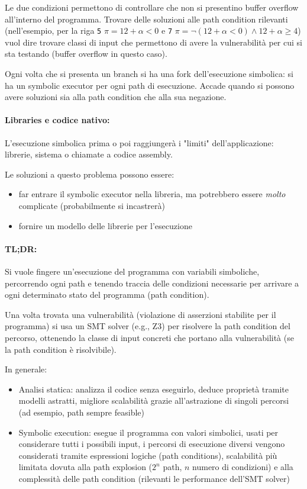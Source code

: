 Le due condizioni permettono di controllare che non si presentino buffer overflow all'interno del programma. Trovare delle soluzioni alle path condition rilevanti (nell'esempio, per la riga \texttt{5} $\pi  =12 + \alpha < 0$ e \texttt{7} $\pi = \neg (12 + \alpha < 0) \wedge 12 + \alpha \geq 4$) vuol dire trovare classi di input che permettono di avere la vulnerabilità per cui si sta testando (buffer overflow in questo caso).

Ogni volta che si presenta un branch si ha una fork dell'esecuzione simbolica: si ha un symbolic executor per ogni path di esecuzione. Accade quando si possono avere soluzioni sia alla path condition che alla sua negazione. 

\paragraph{Libraries e codice nativo:} L'esecuzione simbolica prima o poi raggiungerà i "limiti" dell'applicazione: librerie, sistema o chiamate a codice assembly.

Le soluzioni a questo problema possono essere: 
\begin{itemize}
	\item far entrare il symbolic executor nella libreria, ma potrebbero essere \textit{molto} complicate (probabilmente si incastrerà)

	\item fornire un modello delle librerie per l'esecuzione
\end{itemize}

\paragraph{TL;DR:} Si vuole fingere un'esecuzione del programma con variabili simboliche, percorrendo ogni path e tenendo traccia delle condizioni necessarie per arrivare a ogni determinato stato del programma (path condition). 

Una volta trovata una vulnerabilità (violazione di asserzioni stabilite per il programma) si usa un SMT solver (e.g., Z3) per risolvere la path condition del percorso, ottenendo la classe di input concreti che portano alla vulnerabilità (se la path condition è risolvibile).

In generale:
\begin{itemize}
    \item Analisi statica: analizza il codice senza eseguirlo, deduce proprietà tramite modelli astratti, migliore scalabilità grazie all'astrazione di singoli percorsi (ad esempio, path sempre feasible)
    
    \item Symbolic execution: esegue il programma con valori simbolici, usati per considerare tutti i possibili input, i percorsi di esecuzione diversi vengono considerati tramite espressioni logiche (path conditions), scalabilità più limitata dovuta alla path explosion ($2^n$ path, $n$ numero di condizioni) e alla complessità delle path condition (rilevanti le performance dell'SMT solver)
\end{itemize}

